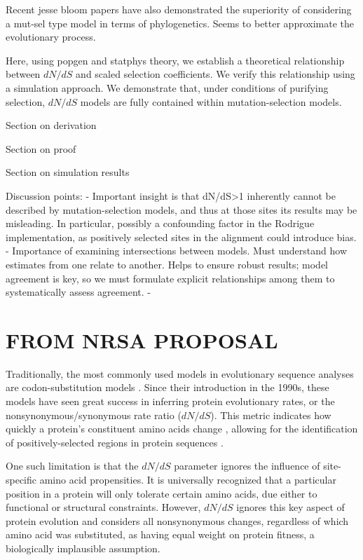 \documentclass[11pt]{article}
\begin{document}
Recent jesse bloom papers have also demonstrated the superiority of considering a mut-sel type model in terms of phylogenetics. Seems to better approximate the evolutionary process.

Here, using popgen and statphys theory, we establish a theoretical relationship between $dN/dS$ and scaled selection coefficients. We verify this relationship using a simulation approach. We demonstrate that, under conditions of purifying selection, $dN/dS$ models are fully contained within mutation-selection models. 

Section on derivation

Section on proof

Section on simulation results

Discussion points:
- Important insight is that dN/dS>1 inherently cannot be described by mutation-selection models, and thus at those sites its results may be misleading. In particular, possibly a confounding factor in the Rodrigue implementation, as positively selected sites in the alignment could introduce bias.
- Importance of examining intersections between models. Must understand how estimates from one relate to another. Helps to ensure robust results; model agreement is key, so we must formulate explicit relationships among them to systematically assess agreement.
- 





\section*{FROM NRSA PROPOSAL}
Traditionally, the most commonly used models in evolutionary sequence analyses are codon-substitution models \cite{Anisimova2009}. Since their introduction in the 1990s, these models have seen great success in inferring protein evolutionary rates, or the nonsynonymous/synonymous rate ratio ($dN/dS$). This metric indicates how quickly a protein's constituent amino acids change \cite{GoldmanYang1994, MuseGaut1994, NielsenYang1998}, allowing for the identification of positively-selected regions in protein sequences \cite{ NielsenYang1998,Yangetal2000}. 

One such limitation is that the $dN/dS$ parameter ignores the influence of site-specific amino acid propensities.  It is universally recognized that a particular position in a protein will only tolerate certain amino acids, due either to functional or structural constraints. However, $dN/dS$ ignores this key aspect of protein evolution and considers all nonsynonymous changes, regardless of which amino acid was substituted, as having equal weight on protein fitness, a biologically implausible assumption. 
\end{document}
